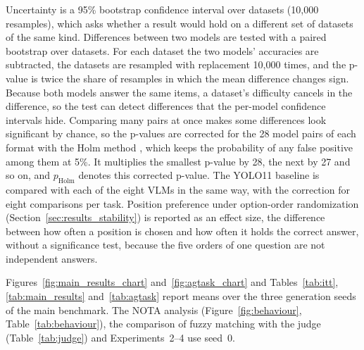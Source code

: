 \documentclass[10pt,letterpaper]{article}
\begin{document}
Uncertainty is a 95\% bootstrap confidence interval \cite{efron_introduction_1993} over datasets (10,000 resamples), which asks whether a result would hold on a different set of datasets of the same kind. Differences between two models are tested with a paired bootstrap over datasets. For each dataset the two models' accuracies are subtracted, the datasets are resampled with replacement 10,000 times, and the p-value is twice the share of resamples in which the mean difference changes sign. Because both models answer the same items, a dataset's difficulty cancels in the difference, so the test can detect differences that the per-model confidence intervals hide. Comparing many pairs at once makes some differences look significant by chance, so the p-values are corrected for the 28 model pairs of each format with the Holm method \cite{holm_simple_1979}, which keeps the probability of any false positive among them at 5\%. It multiplies the smallest p-value by 28, the next by 27 and so on, and $p_{\text{Holm}}$ denotes this corrected p-value. The YOLO11 baseline is compared with each of the eight VLMs in the same way, with the correction for eight comparisons per task. Position preference under option-order randomization (Section~\ref{sec:results_stability}) is reported as an effect size, the difference between how often a position is chosen and how often it holds the correct answer, without a significance test, because the five orders of one question are not independent answers.

Figures~\ref{fig:main_results_chart} and~\ref{fig:agtask_chart} and Tables~\ref{tab:itt}, \ref{tab:main_results} and~\ref{tab:agtask} report means over the three generation seeds of the main benchmark. The NOTA analysis (Figure~\ref{fig:behaviour}, Table~\ref{tab:behaviour}), the comparison of fuzzy matching with the judge (Table~\ref{tab:judge}) and Experiments~2--4 use seed~0.
\end{document}
